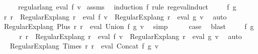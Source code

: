 \begin{isabellebody}
\ \ \ \ \ {\isachardoublequoteopen}regular{\isacharunderscore}{\kern0pt}lang\ {\isacharparenleft}{\kern0pt}eval\ f\ v{\isacharparenright}{\kern0pt}{\isachardoublequoteclose}\isanewline
%
\isadelimproof
%
\endisadelimproof
%
\isatagproof
{}\isamarkupfalse%
\ assms\ \isamarkupfalse%
\ {\isacharparenleft}{\kern0pt}induction\ f\ rule{\isacharcolon}{\kern0pt}\ reg{\isacharunderscore}{\kern0pt}eval{\isachardot}{\kern0pt}induct{\isacharparenright}{\kern0pt}\isanewline
\ \ \isamarkupfalse%
\ {\isacharparenleft}{\kern0pt}{}\ f\ g{\isacharparenright}{\kern0pt}\isanewline
\ \ \isamarkupfalse%
\ \isamarkupfalse%
\ r{}\ r{}\ \ {\isachardoublequoteopen}Regular{\isacharunderscore}{\kern0pt}Exp{\isachardot}{\kern0pt}lang\ r{}\ {\isacharequal}{\kern0pt}\ eval\ f\ v\ {\isasymand}\ Regular{\isacharunderscore}{\kern0pt}Exp{\isachardot}{\kern0pt}lang\ r{}\ {\isacharequal}{\kern0pt}\ eval\ g\ v{\isachardoublequoteclose}\ \isamarkupfalse%
\ auto\isanewline
\ \ \isamarkupfalse%
\ \isamarkupfalse%
\ {\isachardoublequoteopen}Regular{\isacharunderscore}{\kern0pt}Exp{\isachardot}{\kern0pt}lang\ {\isacharparenleft}{\kern0pt}Plus\ r{}\ r{}{\isacharparenright}{\kern0pt}\ {\isacharequal}{\kern0pt}\ eval\ {\isacharparenleft}{\kern0pt}Union\ f\ g{\isacharparenright}{\kern0pt}\ v{\isachardoublequoteclose}\ \isamarkupfalse%
\ simp\isanewline
\ \ \isamarkupfalse%
\ \isamarkupfalse%
\ {\isacharquery}{\kern0pt}case\ \isamarkupfalse%
\ blast\isanewline
{}\isamarkupfalse%
\isanewline
\ \ \isamarkupfalse%
\ {\isacharparenleft}{\kern0pt}{}\ f\ g{\isacharparenright}{\kern0pt}\isanewline
\ \ \isamarkupfalse%
\ \isamarkupfalse%
\ r{}\ r{}\ \ {\isachardoublequoteopen}Regular{\isacharunderscore}{\kern0pt}Exp{\isachardot}{\kern0pt}lang\ r{}\ {\isacharequal}{\kern0pt}\ eval\ f\ v\ {\isasymand}\ Regular{\isacharunderscore}{\kern0pt}Exp{\isachardot}{\kern0pt}lang\ r{}\ {\isacharequal}{\kern0pt}\ eval\ g\ v{\isachardoublequoteclose}\ \isamarkupfalse%
\ auto\isanewline
\ \ \isamarkupfalse%
\ \isamarkupfalse%
\ {\isachardoublequoteopen}Regular{\isacharunderscore}{\kern0pt}Exp{\isachardot}{\kern0pt}lang\ {\isacharparenleft}{\kern0pt}Times\ r{}\ r{}{\isacharparenright}{\kern0pt}\ {\isacharequal}{\kern0pt}\ eval\ {\isacharparenleft}{\kern0pt}Concat\ f\ g{\isacharparenright}{\kern0pt}\ v{\isachardoublequoteclose}\ \isamarkupfalse%

\end{isabellebody}
